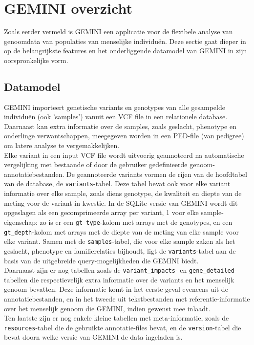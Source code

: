 \chapter{GEMINI overzicht}
\label{gemini_beschrijving}

Zoals eerder vermeld is GEMINI een applicatie voor de flexibele analyse van genoomdata van populaties van menselijke individu\"en. Deze sectie gaat dieper in op de belangrijkste features en het onderliggende datamodel van GEMINI in zijn oorspronkelijke vorm.\cite{10.1371/journal.pcbi.1003153}\cite{gemini_docs}

\section{Datamodel}

GEMINI importeert genetische variants en genotypes van alle gesampelde individu\"en (ook 'samples') vanuit een VCF file in een relationele database.
Daarnaast kan extra informatie over de samples, zoals geslacht, phenotype en onderlinge verwantschappen, meegegeven worden in een PED-file (van pedigree) om latere analyse te vergemakkelijken.\\

Elke variant in een input VCF file wordt uitvoerig geannoteerd na automatische vergelijking met bestaande of door de gebruiker gedefinieerde genoom-annotatiebestanden. De geannoteerde variants vormen de rijen van de hoofdtabel van de database, de \texttt{variants}-tabel. Deze tabel bevat ook voor elke variant informatie over elke sample, zoals diens genotype, de kwaliteit en diepte van de meting voor de variant in kwestie. In de SQLite-versie van GEMINI wordt dit opgeslagen als een gecomprimeerde array per variant, 1 voor elke sample-eigenschap: zo is er een \texttt{gt\_type}-kolom met arrays met de genotypes, en een \texttt{gt\_depth}-kolom met arrays met de diepte van de meting van elke sample voor elke variant. Samen met de \texttt{samples}-tabel, die voor elke sample zaken als het geslacht, phenotype en familierelaties bijhoudt, ligt de \texttt{variants}-tabel aan de basis van de uitgebreide query-mogelijkheden die GEMINI biedt.\\

Daarnaast zijn er nog tabellen zoals de \texttt{variant\_impacts}- en \texttt{gene\_detailed}-tabellen die respectievelijk extra informatie over de variants en het menselijk genoom bevatten. Deze informatie komt in het eerste geval eveneens uit de annotatiebestanden, en in het tweede uit tekstbestanden met referentie-informatie over het menselijk genoom die GEMINI, indien gewenst mee inlaadt.\\
Ten laatste zijn er nog enkele kleine tabellen met meta-informatie, zoals de \texttt{resources}-tabel die de gebruikte annotatie-files bevat, en de \texttt{version}-tabel die bevat doorn welke versie van GEMINI de data ingeladen is.\\\\

